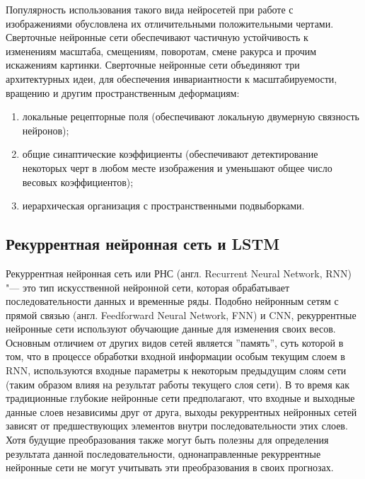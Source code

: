 \documentclass[bachelor, och, coursework]{SCWorks}
\begin{document}
        Популярность использования такого вида нейросетей при работе с изображениями обусловлена их отличительными
        положительными чертами. Сверточные нейронные сети обеспечивают частичную устойчивость к изменениям масштаба,
        смещениям, поворотам, смене ракурса и прочим искажениям картинки. Сверточные нейронные сети объединяют три
        архитектурных идеи, для обеспечения инвариантности к масштабируемости, вращению и другим пространственным
        деформациям:

        \begin{enumerate}
            \item локальные рецепторные поля (обеспечивают локальную двумерную связность нейронов);
            \item общие синаптические коэффициенты (обеспечивают детектирование некоторых черт в любом месте изображения
            и уменьшают общее число весовых коэффициентов);
            \item иерархическая организация с пространственными подвыборками.
        \end{enumerate}

    \subsection{Рекуррентная нейронная сеть и LSTM}

        Рекуррентная нейронная сеть или РНС (англ. Recurrent Neural Network, RNN) "--- это тип искусственной нейронной
        сети, которая обрабатывает последовательности данных и временные ряды. Подобно нейронным сетям с прямой связью
        (англ. Feedforward Neural Network, FNN) и CNN, рекуррентные нейронные сети используют обучающие данные для
        изменения своих весов. Основным отличием от других видов сетей является ''память'', суть которой в том, что в
        процессе обработки входной информации особым текущим слоем в RNN, используются входные параметры к некоторым
        предыдущим слоям сети (таким образом влияя на результат работы текущего слоя сети). В то время как традиционные
        глубокие нейронные сети предполагают, что входные и выходные данные слоев независимы друг от друга, выходы
        рекуррентных нейронных сетей зависят от предшествующих элементов внутри последовательности этих слоев. Хотя
        будущие преобразования также могут быть полезны для определения результата данной последовательности,
        однонаправленные рекуррентные нейронные сети не могут учитывать эти преобразования в своих прогнозах.
\end{document}
